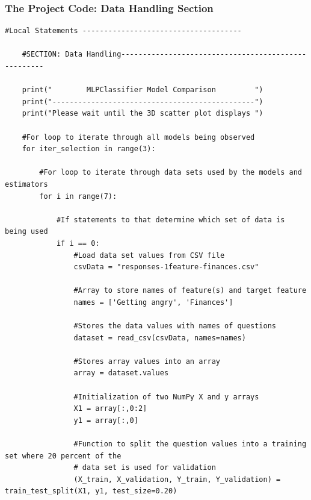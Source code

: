 \documentclass{beamer}
\begin{document}
\begin{frame}[fragile]
\frametitle{The Project Code: Data Handling Section}

\fontsize{6}{5}
\begin{verbatim}
#Local Statements -------------------------------------

    #SECTION: Data Handling----------------------------------------------------

    print("        MLPClassifier Model Comparison         ")
    print("-----------------------------------------------")
    print("Please wait until the 3D scatter plot displays ")

    #For loop to iterate through all models being observed
    for iter_selection in range(3):
  
        #For loop to iterate through data sets used by the models and estimators
        for i in range(7):

            #If statements to that determine which set of data is being used
            if i == 0:
                #Load data set values from CSV file
                csvData = "responses-1feature-finances.csv"
                
                #Array to store names of feature(s) and target feature
                names = ['Getting angry', 'Finances']

                #Stores the data values with names of questions
                dataset = read_csv(csvData, names=names)

                #Stores array values into an array
                array = dataset.values

                #Initialization of two NumPy X and y arrays
                X1 = array[:,0:2]
                y1 = array[:,0]

                #Function to split the question values into a training set where 20 percent of the 
                # data set is used for validation
                (X_train, X_validation, Y_train, Y_validation) = train_test_split(X1, y1, test_size=0.20)
\end{verbatim}
\end{frame}

\end{document}
